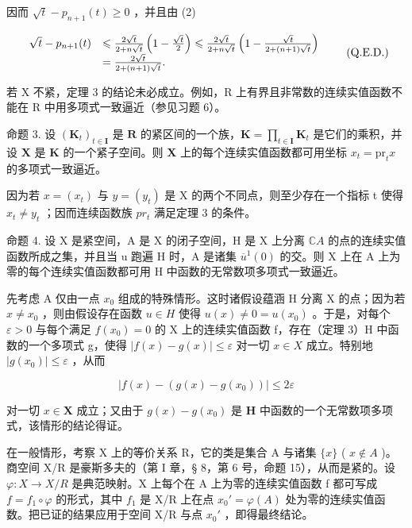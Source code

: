 因而 \(\sqrt{t} - p_{n+1}(t) \geqslant 0\) ，并且由 (2)

\[
\begin{array}{r l} \sqrt {t} - p _ {n + 1} (t) & \leqslant \frac {2 \sqrt {t}}{2 + n \sqrt {t}} \left(1 - \frac {\sqrt {t}}{2}\right) \leqslant \frac {2 \sqrt {t}}{2 + n \sqrt {t}} \left(1 - \frac {\sqrt {t}}{2 + (n + 1) \sqrt {t}}\right) \\ & = \frac {2 \sqrt {t}}{2 + (n + 1) \sqrt {t}}. \end{array} \tag {Q.E.D.}
\]

若 X 不紧，定理 3 的结论未必成立。例如，R 上有界且非常数的连续实值函数不能在 R 中用多项式一致逼近（参见习题 6）。

命题 3. 设 \((\mathbf{K}_t)_{t \in \mathbf{I}}\) 是 \(\mathbf{R}\) 的紧区间的一个族，\(\mathbf{K} = \prod_{t \in \mathbf{I}} \mathbf{K}_t\) 是它们的乘积，并设 \(\mathbf{X}\) 是 \(\mathbf{K}\) 的一个紧子空间。则 \(\mathbf{X}\) 上的每个连续实值函数都可用坐标 \(x_t = \mathrm{pr}_t x\) 的多项式一致逼近。

因为若 \(x = (x_{t})\) 与 \(y = (y_{t})\) 是 X 的两个不同点，则至少存在一个指标 t 使得 \(x_{t} \neq y_{t}\) ；因而连续函数族 \(pr_{t}\) 满足定理 3 的条件。

命题 4. 设 X 是紧空间，A 是 X 的闭子空间，H 是 X 上分离 \(\mathbb{C}A\) 的点的连续实值函数所成之集，并且当 u 跑遍 H 时，A 是诸集 \(\overline{u}^{1}(0)\) 的交。则 X 上在 A 上为零的每个连续实值函数都可用 H 中函数的无常数项多项式一致逼近。

先考虑 A 仅由一点 \(x_{0}\) 组成的特殊情形。这时诸假设蕴涵 H 分离 X 的点；因为若 \(x \neq x_{0}\) ，则由假设存在函数 \(u \in H\) 使得 \(u(x) \neq 0 = u(x_{0})\) 。于是，对每个 \(\varepsilon > 0\) 与每个满足 \(f(x_{0}) = 0\) 的 X 上的连续实值函数 f，存在（定理 3）H 中函数的一个多项式 g，使得 \(|f(x) - g(x)| \leqslant \varepsilon\) 对一切 \(x \in X\) 成立。特别地 \(|g(x_{0})| \leqslant \varepsilon\) ，从而

\[
\left| f (x) - \left(g (x) - g \left(x _ {0}\right)\right) \right| \leqslant 2 \varepsilon
\]

对一切 \(x \in \mathbf{X}\) 成立；又由于 \(g(x) - g(x_0)\) 是 \(\mathbf{H}\) 中函数的一个无常数项多项式，该情形的结论得证。

在一般情形，考察 X 上的等价关系 R，它的类是集合 A 与诸集 \(\{x\}\) ( \(x \notin A\) )。商空间 X/R 是豪斯多夫的（第 I 章，§ 8，第 6 号，命题 15），从而是紧的。设 \(\varphi: X \to X/R\) 是典范映射。X 上每个在 A 上为零的连续实值函数 f 都可写成 \(f = f_{1} \circ \varphi\) 的形式，其中 \(f_{1}\) 是 X/R 上在点 \(x_{0}' = \varphi(A)\) 处为零的连续实值函数。把已证的结果应用于空间 X/R 与点 \(x_{0}'\) ，即得最终结论。

